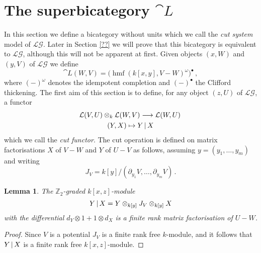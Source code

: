 \documentclass[english,letter paper,12pt,leqno]{article}
\newtheorem{lemma}[theorem]{Lemma}
\theoremstyle{example}
\numberwithin{equation}{section}
\def\LG{\mathcal{LG}}
\def\be{\begin{equation}}
\def\ee{\end{equation}}
\def\nZ{\mathds{Z}}
\DeclareMathOperator{\hmf}{hmf}
\begin{document}
\section{The superbicategory $\cat{L}$}\label{section:lg_cut_system}


In this section we define a bicategory without units which we call the \textsl{cut system} model of $\LG$. Later in Section \ref{??} we will prove that this bicategory is equivalent to $\LG$, although this will not be apparent at first. Given objects $(x,W)$ and $(y,V)$ of $\LG$ we define
\be\label{eq:defnluv}
\cat{L}(W,V) = \Big( \hmf( k[x,y], V - W )^{\omega} \Big)^{\bullet}\,,
\ee
where $(-)^\omega$ denotes the idempotent completion and $(-)^{\bullet}$ the Clifford thickening. The first aim of this section is to define, for any object $(z,U)$ of $\LG$, a functor
\begin{gather*}
\mathcal{L}(V,U) \otimes_k \mathcal{L}(W,V) \longrightarrow \mathcal{L}(W, U)\,\\
(Y,X) \mapsto Y \,|\, X
\end{gather*}
which we call the \textsl{cut functor}. The cut operation is defined on matrix factorisations $X$ of $V - W$ and $Y$ of $U - V$ as follows, assuming $y = (y_1,\ldots,y_m)$ and writing
\be\label{eq:defnjacobian}
J_V = k[y] / ( \partial_{y_1} V, \ldots, \partial_{y_m} V )\,.
\ee

\begin{lemma} The $\nZ_2$-graded $k[x,z]$-module
\[
Y \,|\, X = Y \otimes_{k[y]} J_V \otimes_{k[y]} X
\]
with the differential $d_Y \otimes 1 + 1 \otimes d_X$ is a finite rank matrix factorisation of $U - W$.
\end{lemma}
\begin{proof}
Since $V$ is a potential $J_V$ is a finite rank free $k$-module, and it follows that $Y \,|\, X$ is a finite rank free $k[x,z]$-module. 


\end{proof}
\end{document}
